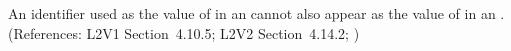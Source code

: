 An identifier used as the value of  in an \EventAssignment
cannot also appear as the value of  in an \AssignmentRule.
(References: L2V1 Section~4.10.5; L2V2 Section~4.14.2;
)
